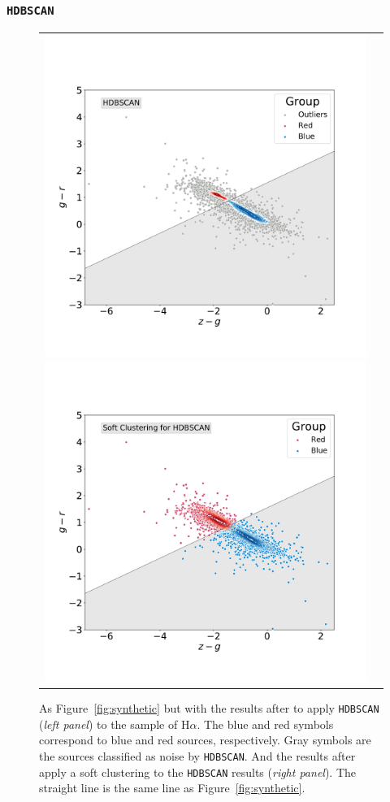\documentclass[fleqn,usenatbib]{mnras}
\begin{document}
\subsubsection{\texttt{HDBSCAN}}

\begin{figure}
\centering
\begin{tabular}{l l}
  \includegraphics[width=0.5\linewidth, trim=10 10 5 8, clip]{Figs/blued-red-hdbscan.pdf}
   \includegraphics[width=0.5\linewidth, trim=10 10 5 8, clip]{Figs/blue-red-hdbscan-soft-alternative.pdf}
  \end{tabular}  
  \caption{As Figure~\ref{fig:synthetic} but with the results after to apply \texttt{HDBSCAN} (\textit{left panel})
  to the sample of H{$\alpha$}. The blue and red symbols correspond to blue and red sources, respectively.
  Gray symbols are the sources classified as noise by \texttt{HDBSCAN}. And the results after apply a soft clustering 
  to the \texttt{HDBSCAN} results (\textit{right panel}). The straight line is the same line as Figure~\ref{fig:synthetic}.}
\label{fig:hdbscan}
\end{figure}
\end{document}

